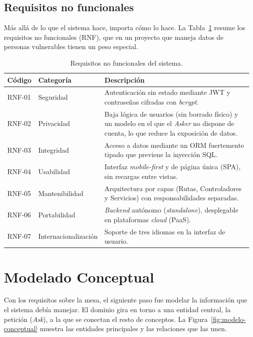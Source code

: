 \documentclass[11pt,oneside,spanish,listoffigures,listoftables]{tfgetsinf}
\begin{document}
\subsection{Requisitos no funcionales}

Más allá de lo que el sistema hace, importa cómo lo hace. La Tabla~\ref{tab:requisitos-no-funcionales} resume los requisitos no funcionales (RNF), que en un proyecto que maneja datos de personas vulnerables tienen un peso especial.

\begin{table}[ht]
\centering
\caption[Requisitos no funcionales del sistema]{Requisitos no funcionales del sistema.}
\label{tab:requisitos-no-funcionales}
\footnotesize
\renewcommand{\arraystretch}{1.3}
\begin{tabularx}{\textwidth}{%
  >{\raggedright\arraybackslash}p{1.4cm}%
  >{\raggedright\arraybackslash}p{3cm}%
  >{\raggedright\arraybackslash}X}
\toprule
\textbf{Código} & \textbf{Categoría} & \textbf{Descripción} \\
\midrule
RNF-01 & Seguridad & Autenticación sin estado mediante JWT y contraseñas cifradas con \textit{bcrypt}. \\
RNF-02 & Privacidad & Baja lógica de usuarios (sin borrado físico) y un modelo en el que el \textit{Asker} no dispone de cuenta, lo que reduce la exposición de datos. \\
RNF-03 & Integridad & Acceso a datos mediante un ORM fuertemente tipado que previene la inyección SQL. \\
RNF-04 & Usabilidad & Interfaz \textit{mobile-first} y de página única (SPA), sin recargas entre vistas. \\
RNF-05 & Mantenibilidad & Arquitectura por capas (Rutas, Controladores y Servicios) con responsabilidades separadas. \\
RNF-06 & Portabilidad & \textit{Backend} autónomo (\textit{standalone}), desplegable en plataformas \textit{cloud} (PaaS). \\
RNF-07 & Internacionalización & Soporte de tres idiomas en la interfaz de usuario. \\
\bottomrule
\end{tabularx}
\end{table}

\section{Modelado Conceptual}

Con los requisitos sobre la mesa, el siguiente paso fue modelar la información que el sistema debía manejar. El dominio gira en torno a una entidad central, la petición (\textit{Ask}), a la que se conectan el resto de conceptos. La Figura~\ref{fig:modelo-conceptual} muestra las entidades principales y las relaciones que las unen.
\end{document}

